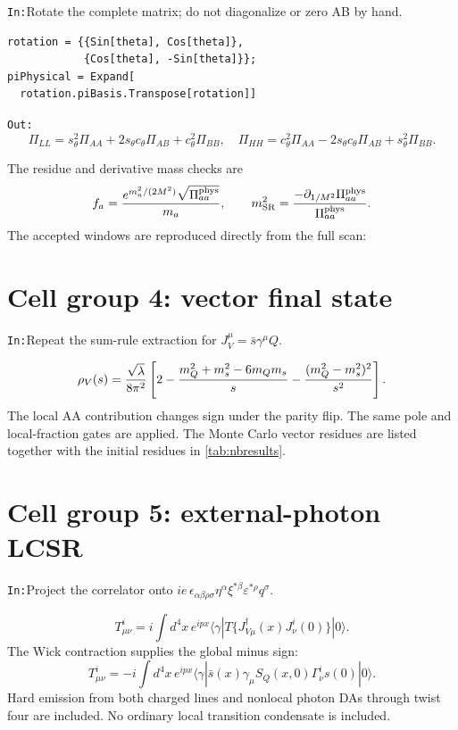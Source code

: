 \documentclass[10pt,a4paper]{article}
\newcommand{\InputCell}[1]{%
  \par\medskip\noindent\colorbox{cellblue}{%
  \parbox{\dimexpr\linewidth-2\fboxsep}{\texttt{In:}\quad #1}}\par\smallskip}
\newcommand{\OutputCell}[1]{%
  \par\smallskip\noindent\colorbox{outputgray}{%
  \parbox{\dimexpr\linewidth-2\fboxsep}{\texttt{Out:}\quad #1}}\par\medskip}
\begin{document}
\InputCell{Rotate the complete matrix; do not diagonalize or zero AB by hand.}
\begin{lstlisting}
rotation = {{Sin[theta], Cos[theta]},
            {Cos[theta], -Sin[theta]}};
piPhysical = Expand[
  rotation.piBasis.Transpose[rotation]]
\end{lstlisting}
\OutputCell{\[
\Pi_{LL}=s_\theta^2\Pi_{AA}+2s_\theta c_\theta\Pi_{AB}
+c_\theta^2\Pi_{BB},\quad
\Pi_{HH}=c_\theta^2\Pi_{AA}-2s_\theta c_\theta\Pi_{AB}
+s_\theta^2\Pi_{BB}.
\]}

The residue and derivative mass checks are
\begin{equation}
f_a={e^{m_a^2/(2M^2)}\sqrt{\Pi_{aa}^{\rm phys}}\over m_a},
\qquad
m_{\rm SR}^2={-\partial_{1/M^2}\Pi_{aa}^{\rm phys}
\over\Pi_{aa}^{\rm phys}}.
\end{equation}
The accepted windows are reproduced directly from the full scan:
\begin{table}[H]
\centering\small

\caption{Two-point acceptance ledger.}
\end{table}

\section{Cell group 4: vector final state}

\InputCell{Repeat the sum-rule extraction for
$J_V^\mu=\bar s\gamma^\mu Q$.}
\begin{equation}
\rho_V(s)={\sqrt\lambda\over8\pi^2}
\left[2-{m_Q^2+m_s^2-6m_Qm_s\over s}
-{(m_Q^2-m_s^2)^2\over s^2}\right].
\end{equation}
The local AA contribution changes sign under the parity flip.  The same pole
and local-fraction gates are applied.  The Monte Carlo vector residues are
listed together with the initial residues in \cref{tab:nbresults}.

\section{Cell group 5: external-photon LCSR}

\InputCell{Project the correlator onto
$ie\,\epsilon_{\alpha\beta\rho\sigma}
\eta^\alpha\xi^{*\beta}\varepsilon^{*\rho}q^\sigma$.}
\begin{equation}
T_{\mu\nu}^i=i\int d^4x\,e^{ipx}
\langle\gamma|T\{J_{V\mu}^\dagger(x)J_\nu^i(0)\}|0\rangle .
\end{equation}
The Wick contraction supplies the global minus sign:
\begin{equation}
T_{\mu\nu}^i=-i\int d^4x\,e^{ipx}
\langle\gamma|\bar s(x)\gamma_\mu S_Q(x,0)\Gamma_\nu^i s(0)|0\rangle.
\end{equation}
Hard emission from both charged lines and nonlocal photon DAs through twist
four are included.  No ordinary local transition condensate is included.
\end{document}
